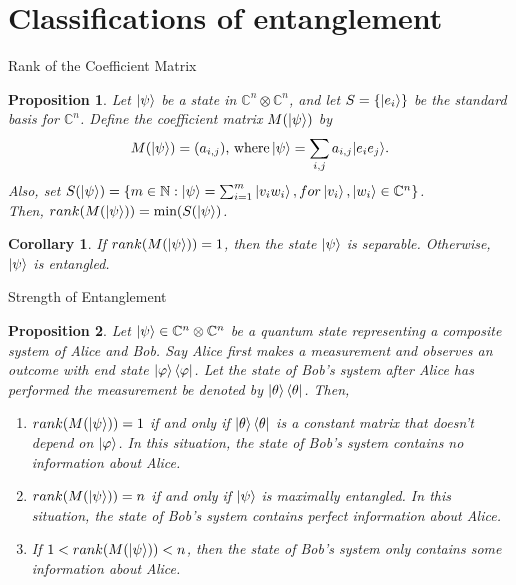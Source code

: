\documentclass[handout, 10 pt]{beamer}
\newtheorem{prop}{Proposition}
\newtheorem{corol}{Corollary}
\begin{document}
\section{Classifications of entanglement}
\begin{frame}{Rank of the Coefficient Matrix}
\begin{prop}
\label{rank prop}
Let $\ket{\psi}$ be a state in $\mathbb{C}^n \otimes \mathbb{C}^n$, and let $S=\{\ket{e_i}\}$ be the standard basis for $\mathbb{C}^n$. Define the coefficient matrix $M(\ket{\psi})$ by
\begin{equation}
M(\ket{\psi})=(a_{i,j}) \textrm{, where}\ket{\psi}=\sum\limits_{i,j}a_{i,j}|e_i e_j\rangle . 
\end{equation}
Also, set $S(\ket{\psi})=\{m\in \mathbb{N}: \ket{\psi}=\sum_{i=1}^m\ket{v_i w_i}, for \ket{v_i}, \ket{w_i} \in \mathbb{C}^n\}$.\\  Then, $rank(M(\ket{\psi}))=\textrm{min} (S(\ket{\psi})$.
\end{prop}
\pause

\begin{corol}
If $rank(M(\ket{\psi}))=1$, then the state $\ket{\psi}$ is separable. Otherwise, $\ket{\psi}$ is entangled.
\end{corol}
\end{frame}

\begin{frame}{Strength of Entanglement}
    \begin{prop}
\label{entanglement-rank}
Let $\ket{\psi} \in \mathbb{C}^n \otimes \mathbb{C}^{n}$ be a quantum state representing a composite system of Alice and Bob. Say Alice first makes a measurement and observes an outcome with end state $\ket{\varphi}\bra{\varphi}$. Let the state of Bob's system after Alice has performed the measurement be denoted by $\ket{\theta}\bra{\theta}$. Then,
\pause
\begin{enumerate}
    \item $rank(M(\ket{\psi}))=1$ if and only if $\ket{\theta}\bra{\theta}$ is a constant matrix that doesn't depend on $\ket{\varphi}$. In this situation, the state of Bob's system contains no information about Alice.
    \pause
    \item $rank(M(\ket{\psi}))=n$ if and only if $\ket{\psi}$ is maximally entangled. In this situation, the state of Bob's system contains perfect information about Alice.
    \pause
    \item If $1<rank(M(\ket{\psi}))<n$, then the state of Bob's system only contains some information about Alice.
\end{enumerate}
\end{prop}
\end{frame}
\end{document}
